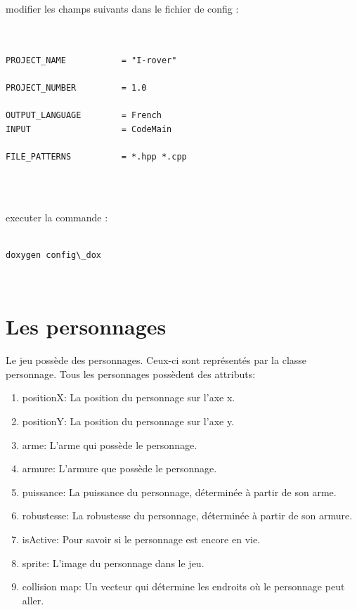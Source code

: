 \documentclass[a4paper 12pts]{article}
\newenvironment{DDbox}[1]{
\begin{lrbox}{\BBbox}\begin{minipage}{\linewidth}}
{\end{minipage}\end{lrbox}\noindent\colorbox{Zgris}{\usebox{\BBbox}} \\
[.5cm]}
\begin{document}
modifier les champs suivants dans le fichier de config :

\vspace{0.3 cm}


\begin{DDbox}{\linewidth}
\begin{verbatim}


PROJECT_NAME           = "I-rover"

PROJECT_NUMBER         = 1.0

OUTPUT_LANGUAGE        = French
INPUT                  = CodeMain

FILE_PATTERNS          = *.hpp *.cpp


\end{verbatim}
\end{DDbox}


executer la commande :

\vspace{0.3 cm}

\begin{DDbox}{\linewidth}
\begin{verbatim}

doxygen config\_dox
\end{verbatim}
\end{DDbox}
\vspace{0.3 cm}

\newpage
\section{Les personnages}
Le jeu possède des personnages. Ceux-ci sont représentés par la classe personnage. Tous les personnages possèdent des attributs:
\begin{enumerate}
	\item positionX: La position du personnage sur l'axe x.
	\item positionY: La position du personnage sur l'axe y.
	\item arme: L'arme qui possède le personnage.
	\item armure: L'armure que possède le personnage.
	\item puissance: La puissance du personnage, déterminée à partir de son arme.
	\item robustesse: La robustesse du personnage, déterminée à partir de son armure.
	\item isActive: Pour savoir si le personnage est encore en vie.
	\item sprite: L'image du personnage dans le jeu.
	\item collision map: Un vecteur qui détermine les endroits où le personnage peut aller.
\end{enumerate}
\end{document}
